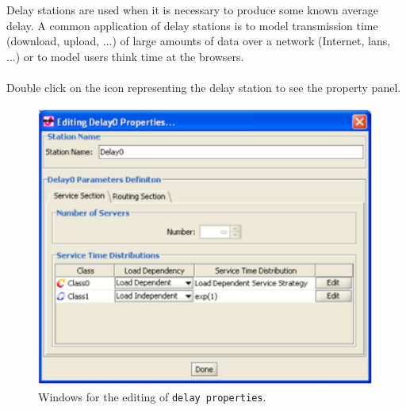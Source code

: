 Delay stations are used when it is necessary to produce some known
average delay. A common application of delay stations is to model
transmission time (download, upload, ...) of large amounts of data
over a network (Internet, lans, ...) or to model users think time
at the browsers.\\

\\ Double
click on the icon representing the delay station to see the
property panel.\\
\begin{figure}[htb]
    \begin{center}
        \includegraphics[scale=.5]{img/jsimg/8.15.eps}
    \end{center}
    \caption{Windows for the editing of \texttt{delay properties}.}
    \label{fig:editdprop}
\end{figure}

